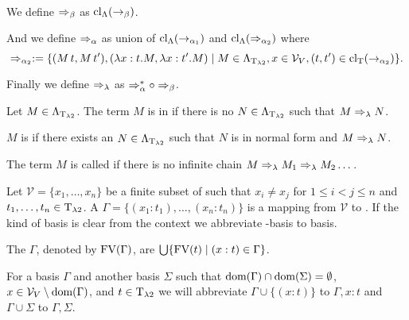 \begin{definition}~

We define $\Rightarrow_\beta$ as $\text{cl\textsubscript{$\Lambda$}}(\rightarrow_\beta)$.

And we define $\Rightarrow_\alpha$ as union of $\text{cl\textsubscript{$\Lambda$}}(\rightarrow_{\alpha_1})$ and $\text{cl\textsubscript{$\Lambda$}}(\Rightarrow_{\alpha_2})$ where \[\Rightarrow_{\alpha_2}:=\{(M\,t,M\,t'),(\lambda x:t.M,\lambda x:t'.M)\mid M\in\Lambda_{\text{T}_{\lambda2}},x\in\mathcal{V}_V,(t,t')\in\text{cl\textsubscript{T}}(\rightarrow_{\alpha_2})\}.\]

Finally we define $\Rightarrow_\lambda$ as $\Rightarrow_\alpha^*\circ\Rightarrow_\beta$.
\end{definition}

\begin{definition}\label{def.2.8}
Let $M\in\Lambda_{\text{T}_{\lambda2}}$. The term $M$ is in  if there is no $N\in\Lambda_{\text{T}_{\lambda2}}$ such that $M\Rightarrow_\lambda N$.

$M$ is  if there exists an $N\in\Lambda_{\text{T}_{\lambda2}}$ such that $N$ is in normal form and $M\Rightarrow_\lambda N$.

The term $M$ is called  if there is no infinite chain $M\Rightarrow_\lambda M_1\Rightarrow_\lambda M_2\dots$.
\end{definition}

\begin{definition}\label{def.2.9} Let $\mathcal{V}=\{x_1,\dots,x_n\}$ be a finite subset of \lambdaValVar{} such that $x_i\neq x_j$ for $1\leq i<j\leq n$ and $t_1,\dots,t_n\in\text{T}_{\lambda2}$.	A  $\Gamma=\{(x_1:t_1),\dots,(x_n:t_n)\}$ is a mapping from $\mathcal{V}$ to \lambdaTypes{}. If the kind of basis is clear from the context we abbreviate \lambdaTwo-basis to basis. 

The  $\Gamma$, denoted by $\text{FV}(\Gamma)$, are $\bigcup\{\text{FV}(t)\mid(x:t)\in\Gamma\}$.
\end{definition}

For a basis $\Gamma$ and another basis $\Sigma$ such that $\text{dom}(\Gamma)\cap\text{dom}(\Sigma)=\emptyset$, $x\in\mathcal{V}_V\setminus\text{dom}(\Gamma)$, and $t\in\text{T}_{\lambda2}$ we will abbreviate $\Gamma\cup\{(x:t)\}$ to $\Gamma,x:t$ and $\Gamma\cup\Sigma$ to $\Gamma,\Sigma$. %

